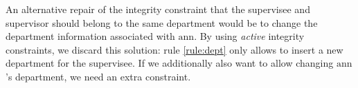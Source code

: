 \begin{example}
  An alternative repair of the integrity constraint that the supervisee and supervisor should belong to the same department would be to change the department information associated with $\mathrm{ann}$. 
  By using \emph{active} integrity constraints, we discard this solution: rule \eqref{rule:dept} only allows to insert a new department for the supervisee. 
  If we additionally also want to allow changing $\mathrm{ann}$'s department, we need an extra constraint. 
\end{example}	


